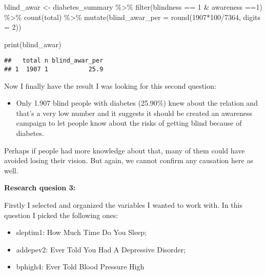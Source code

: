 \documentclass[
]{article}
\newenvironment{Shaded}{\begin{snugshade}}{\end{snugshade}}
\newcommand{\AttributeTok}[1]{\textcolor[rgb]{0.77,0.63,0.00}{#1}}
\newcommand{\DecValTok}[1]{\textcolor[rgb]{0.00,0.00,0.81}{#1}}
\newcommand{\FunctionTok}[1]{\textcolor[rgb]{0.00,0.00,0.00}{#1}}
\newcommand{\NormalTok}[1]{#1}
\newcommand{\OtherTok}[1]{\textcolor[rgb]{0.56,0.35,0.01}{#1}}
\newcommand{\SpecialCharTok}[1]{\textcolor[rgb]{0.00,0.00,0.00}{#1}}
\providecommand{\tightlist}{%
  \setlength{\itemsep}{0pt}\setlength{\parskip}{0pt}}
\begin{document}
\begin{Shaded}
\begin{Highlighting}[]
\NormalTok{blind\_awar }\OtherTok{\textless{}{-}}\NormalTok{ diabetes\_summary }\SpecialCharTok{\%\textgreater{}\%} 
  \FunctionTok{filter}\NormalTok{(blindness }\SpecialCharTok{==} \DecValTok{1} \SpecialCharTok{\&}\NormalTok{ awareness }\SpecialCharTok{==}\DecValTok{1}\NormalTok{) }\SpecialCharTok{\%\textgreater{}\%}  
  \FunctionTok{count}\NormalTok{(total) }\SpecialCharTok{\%\textgreater{}\%} 
  \FunctionTok{mutate}\NormalTok{(}\AttributeTok{blind\_awar\_per =} \FunctionTok{round}\NormalTok{(}\DecValTok{1907}\SpecialCharTok{*}\DecValTok{100}\SpecialCharTok{/}\DecValTok{7364}\NormalTok{, }\AttributeTok{digits =} \DecValTok{2}\NormalTok{)) }
  
  
\FunctionTok{print}\NormalTok{(blind\_awar)  }
\end{Highlighting}
\end{Shaded}

\begin{verbatim}
##   total n blind_awar_per
## 1  1907 1           25.9
\end{verbatim}

Now I finally have the result I was looking for this second question:

\begin{itemize}
\tightlist
\item
  Only 1.907 blind people with diabetes (25.90\%) knew about the
  relation and that's a very low number and it suggests it should be
  created an awareness campaign to let people know about the risks of
  getting blind because of diabetes.
\end{itemize}

Perhaps if people had more knowledge about that, many of them could have
avoided losing their vision. But again, we cannot confirm any causation
here as well.

\textbf{Research quesion 3:}

Firstly I selected and organized the variables I wanted to work with. In
this question I picked the following ones:

\begin{itemize}
\tightlist
\item
  sleptim1: How Much Time Do You Sleep;
\item
  addepev2: Ever Told You Had A Depressive Disorder;
\item
  bphigh4: Ever Told Blood Pressure High
\end{itemize}
\end{document}
